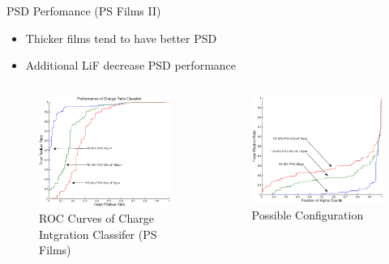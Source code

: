 \begin{frame}{PSD Perfomance (PS Films II)}
\small
\begin{itemize}
	\item Thicker films tend to have better PSD
	\item Additional LiF decrease PSD performance
\end{itemize}
\begin{columns}[onlytextwidth]
\begin{column}{0.45\textwidth}
	\tiny
	\begin{figure}
		\centering
		\includegraphics[width=\textwidth]{images/ROC_Comparison.eps}
		\caption{ROC Curves of Charge Intgration Classifer (PS Films)}
	\end{figure}
\end{column}
\begin{column}{0.45\textwidth}
	\tiny
	\begin{figure}
		\centering
		\includegraphics[width=\textwidth]{images/FPRvsFractionCounts_Comparison.eps}
		\caption{Possible Configuration}
	\end{figure}
\end{column}
\end{columns}
\end{frame}
